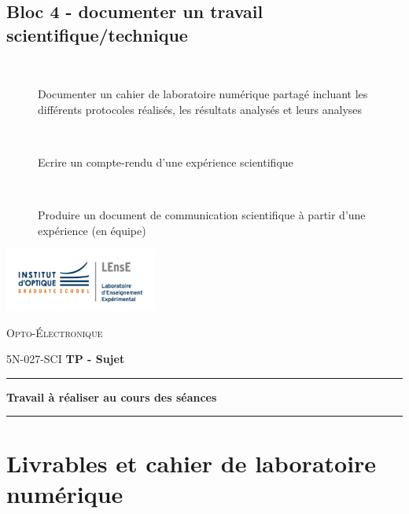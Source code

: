 \documentclass[a4paper,11pt,twoside]{book} %
\begin{document}
{\subsection{Bloc 4 - documenter un travail scientifique/technique}

\begin{description}
	\item[\colorbox{violet_iogs!70}{\textcolor{white}{B 4.1}}] Documenter un cahier de laboratoire numérique partagé incluant les différents protocoles réalisés, les résultats analysés et leurs analyses
	\item[\colorbox{violet_iogs!70}{\textcolor{white}{B 4.2}}] Ecrire un compte-rendu d'une expérience scientifique
	\item[\colorbox{violet_iogs!70}{\textcolor{white}{B 4.3}}] Produire un document de communication scientifique à partir d'une expérience (en équipe)
\end{description}


\newpage


\begin{minipage}[c]{.25\linewidth}
	\includegraphics[width=5cm]{images/LEnsE_IOGS.jpg}
\end{minipage} \hfill
\begin{minipage}[c]{.4\linewidth}

\begin{center}
\vspace{0.3cm}
{\Large \textsc{Opto-Électronique}}

\medskip

5N-027-SCI \qquad \textbf{\Large TP - Sujet}

\end{center}
\end{minipage}\hfill

\vspace{0.5cm}

\noindent \rule{\linewidth}{1pt}

{\noindent\Large  \rule[-7pt]{0pt}{30pt}
 \textbf{Travail à réaliser au cours des séances}}

\noindent \rule{\linewidth}{1pt}


\section{Livrables et cahier de laboratoire numérique}

}
\end{document}

